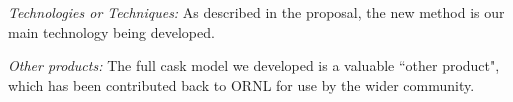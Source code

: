 \documentclass[12pt]{article}
\begin{document}
\textit{Technologies or Techniques:} As described in the proposal, the new method is our main technology being developed. 

\textit{Other products:} The full cask model we developed is a valuable ``other product", which has been contributed back to ORNL for use by the wider community.










\appendix

\makeatletter
\def\@seccntformat#1{APPENDIX \csname the#1\endcsname.~}
\makeatother

%
%
%
\end{document}
